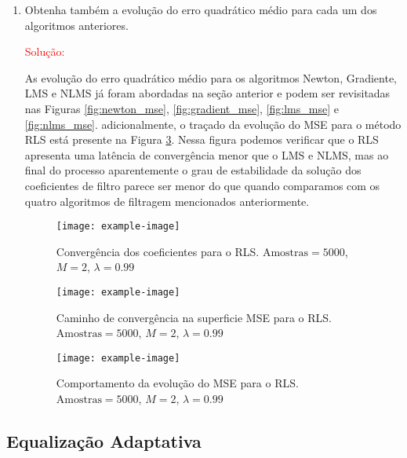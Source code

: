 \begin{enumerate}
    \item Obtenha também a evolução do erro quadrático médio para cada um dos algoritmos anteriores.

        \textcolor{red}{Solução:} 

        As evolução do erro quadrático médio para os algoritmos Newton, Gradiente, LMS e NLMS já foram abordadas na seção 
        anterior e podem ser revisitadas nas Figuras \ref{fig:newton_mse}, \ref{fig:gradient_mse}, \ref{fig:lms_mse} e \ref{fig:nlms_mse}.
        adicionalmente, o traçado da evolução do MSE para o método RLS está presente na Figura \ref{fig:rls_mse}. Nessa figura podemos verificar
        que o RLS apresenta uma latência de convergência menor que o LMS e NLMS, mas ao final do processo aparentemente o grau de estabilidade da
        solução dos coeficientes de filtro parece ser menor do que quando comparamos com os quatro algoritmos de filtragem mencionados anteriormente.


\begin{figure}[!htp]
    \centering
    \texttt{[image: example-image]}
    \caption{Convergência dos coeficientes para o RLS. $\text{Amostras} = 5000$, $M = 2$, $\lambda = 0.99$}
    \label{fig:rls_coefficient}
\end{figure}

\begin{figure}[!htp]
    \centering
    \texttt{[image: example-image]}
    \caption{Caminho de convergência na superficie MSE para o RLS. $\text{Amostras} = 5000$, $M = 2$, $\lambda = 0.99$}
    \label{fig:rls_contour}
\end{figure}

\begin{figure}[!htp]
    \centering
    \texttt{[image: example-image]}
    \caption{Comportamento da evolução do MSE para o RLS. $\text{Amostras} = 5000$, $M = 2$, $\lambda = 0.99$}
    \label{fig:rls_mse}
\end{figure}

\end{enumerate}


\subsection{Equalização Adaptativa} %


